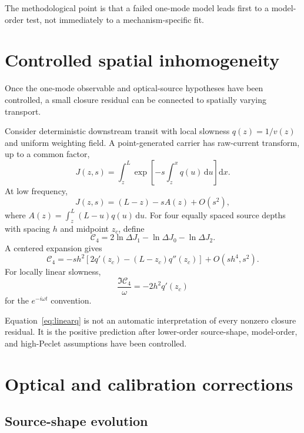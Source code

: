 \documentclass[11pt]{article}
\newcommand{\Cfour}{\mathcal{C}_4}
\newcommand{\dd}{\mathrm{d}}
\begin{document}
The methodological point is that a failed one-mode model leads first to a model-order test, not immediately to a mechanism-specific fit.

\section{Controlled spatial inhomogeneity}

Once the one-mode observable and optical-source hypotheses have been controlled, a small closure residual can be connected to spatially varying transport.

Consider deterministic downstream transit with local slowness $q(z)=1/v(z)$ and uniform weighting field. A point-generated carrier has raw-current transform, up to a common factor,
\begin{equation}
J(z,s)=\int_z^L
\exp\left[-s\int_z^x q(u)\,\dd u\right]\dd x.
\label{eq:Jvarying}
\end{equation}
At low frequency,
\begin{equation}
J(z,s)=(L-z)-sA(z)+O(s^2),
\end{equation}
where $A(z)=\int_z^L(L-u)q(u)\,\dd u$. For four equally spaced source depths with spacing $h$ and midpoint $z_c$, define
\begin{equation}
\Cfour=2\ln\Delta J_1-\ln\Delta J_0-\ln\Delta J_2.
\end{equation}
A centered expansion gives
\begin{equation}
\boxed{
\Cfour=-s h^2\left[2q'(z_c)-(L-z_c)q''(z_c)\right]
+O(sh^4,s^2).}
\label{eq:gradienttheorem}
\end{equation}
For locally linear slowness,
\begin{equation}
\boxed{
\frac{\Im\Cfour}{\omega}=-2h^2q'(z_c)}
\label{eq:linearq}
\end{equation}
for the $e^{-i\omega t}$ convention.

Equation~\eqref{eq:linearq} is not an automatic interpretation of every nonzero closure residual. It is the positive prediction after lower-order source-shape, model-order, and high-Peclet assumptions have been controlled.

\section{Optical and calibration corrections}

\subsection{Source-shape evolution}
\end{document}
